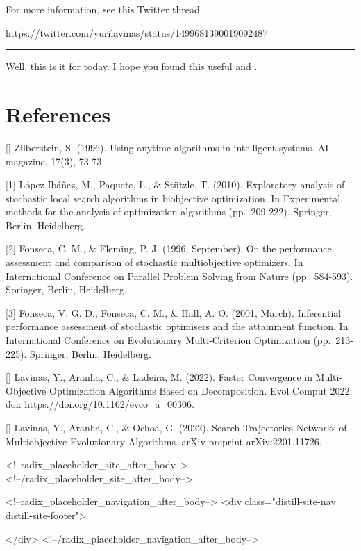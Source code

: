 \documentclass[
]{article}
\begin{document}
For more information, see this Twitter thread.

\url{https://twitter.com/yurilavinas/status/1499681390019092487}

\begin{center}\rule{0.5\linewidth}{0.5pt}\end{center}

Well, this is it for today. I hope you found this useful and .

\hypertarget{references}{%
\section{References}\label{references}}

{[}{]} Zilberstein, S. (1996). Using anytime algorithms in intelligent
systems. AI magazine, 17(3), 73-73.

{[}1{]} López-Ibáñez, M., Paquete, L., \& Stützle, T. (2010).
Exploratory analysis of stochastic local search algorithms in
biobjective optimization. In Experimental methods for the analysis of
optimization algorithms (pp.~209-222). Springer, Berlin, Heidelberg.

{[}2{]} Fonseca, C. M., \& Fleming, P. J. (1996, September). On the
performance assessment and comparison of stochastic multiobjective
optimizers. In International Conference on Parallel Problem Solving from
Nature (pp.~584-593). Springer, Berlin, Heidelberg.

{[}3{]} Fonseca, V. G. D., Fonseca, C. M., \& Hall, A. O. (2001, March).
Inferential performance assessment of stochastic optimisers and the
attainment function. In International Conference on Evolutionary
Multi-Criterion Optimization (pp.~213-225). Springer, Berlin,
Heidelberg.

{[}{]} Lavinas, Y., Aranha, C., \& Ladeira, M. (2022). Faster
Convergence in Multi-Objective Optimization Algorithms Based on
Decomposition. Evol Comput 2022; doi:
\url{https://doi.org/10.1162/evco_a_00306}.

{[}{]} Lavinas, Y., Aranha, C., \& Ochoa, G. (2022). Search Trajectories
Networks of Multiobjective Evolutionary Algorithms. arXiv preprint
arXiv:2201.11726.

<!--radix_placeholder_site_after_body-->
<!--/radix_placeholder_site_after_body-->

<!--radix_placeholder_navigation_after_body-->
<div class="distill-site-nav distill-site-footer">

</div>
<!--/radix_placeholder_navigation_after_body-->
\end{document}
